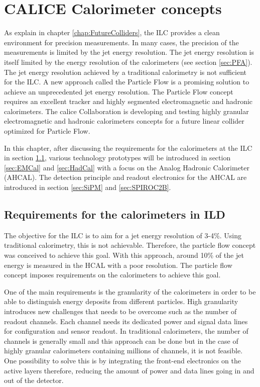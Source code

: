 \chapter{CALICE Calorimeter concepts}
\label{chap:CALICE_Det}

As explain in chapter \ref{chap:FutureColliders}, the ILC provides a clean environment for precision measurements. In many cases, the precision of the measurements is limited by the jet energy resolution. The jet energy resolution is itself limited by the energy resolution of the calorimeters (see section \ref{sec:PFA}). The jet energy resolution achieved by a traditional calorimetry is not sufficient for the ILC. A new approach called the Particle Flow is a promising solution to achieve an unprecedented jet energy resolution. The Particle Flow concept requires an excellent tracker and highly segmented electromagnetic and hadronic calorimeters. The \acrshort{calice} Collaboration is developing and testing highly granular electromagnetic and hadronic ca\-lo\-ri\-me\-ters concepts for a future linear collider optimized for Particle Flow.

In this chapter, after discussing the requirements for the calorimeters at the ILC in section \ref{sec:CaloRequirements}, various technology prototypes will be introduced in section \ref{sec:EMCal} and \ref{sec:HadCal} with a focus on the Analog Hadronic Calorimeter (AHCAL). The detection principle and readout electronics for the AHCAL are introduced in section \ref{sec:SiPM} and \ref{sec:SPIROC2B}.

\section{Requirements for the calorimeters in ILD}
\label{sec:CaloRequirements}

The objective for the ILC is to aim for a jet energy resolution of 3-4\%. Using traditional calorimetry, this is not achievable. Therefore, the particle flow concept was conceived to achieve this goal. With this approach, around 10\% of the jet energy is measured in the HCAL with a poor resolution. The particle flow concept imposes requirements on the calorimeters to achieve this goal.

One of the main requirements is the granularity of the calorimeters in order to be able to distinguish energy deposits from different particles. High granularity introduces new challenges that needs to be overcome such as the number of readout channels. Each channel needs its dedicated power and signal data lines for configuration and sensor readout. In traditional calorimeters, the number of channels is generally small and this approach can be done but in the case of highly granular calorimeters containing millions of channels, it is not feasible. One possibility to solve this is by integrating the front-end electronics on the active layers therefore, reducing the amount of power and data lines going in and out of the detector.

